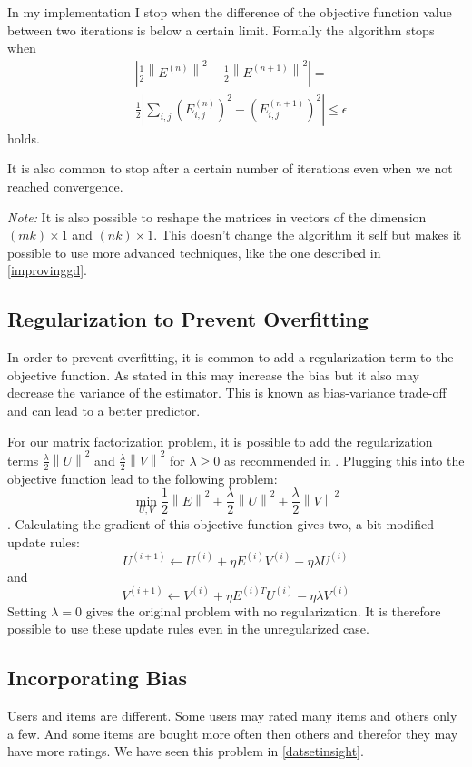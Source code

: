 \documentclass[DIV=14,twocolumn]{scrartcl}
\newcommand{\norm}[1]{\left\lVert#1\right\rVert}
\begin{document}
In my implementation I stop when the difference of the objective function value between two iterations is below a certain limit. Formally the algorithm stops when
\begin{equation*}
\begin{split}
&|\frac{1}{2}\norm{E^{(n)}}^2-\frac{1}{2}\norm{E^{(n+1)}}^2|=\\
&\frac{1}{2}|\sum_{i,j}(E_{i,j}^{(n)})^2-(E_{i,j}^{(n+1)})^2|\leq\epsilon
\end{split}
\end{equation*} $$$$ holds.

It is also common to stop after a certain number of iterations even when we not reached convergence.

\textit{Note:} It is also possible to reshape the matrices in vectors of the dimension $(mk)\times1$ and $(nk)\times1$. This doesn't change the algorithm it self but makes it possible to use more advanced techniques, like the one described in \autoref{improvinggd}.

\subsection{Regularization to Prevent Overfitting}
In order to prevent overfitting, it is common to add a regularization term to the objective function. As stated in \cite{Gi19} this may increase the bias but it also may decrease the variance of the estimator. This is known as bias-variance trade-off and can lead to a better predictor. 

For our matrix factorization problem, it is possible to add the regularization terms $\frac{\lambda}{2}\norm{U}^2$ and $\frac{\lambda}{2}\norm{V}^2$ for $\lambda \geq 0$ as recommended in \cite{Ag16}.
Plugging this into the objective function lead to the following problem: $$\min_{U,V} \frac{1}{2}\norm{E}^2 + \frac{\lambda}{2}\norm{U}^2 + \frac{\lambda}{2}\norm{V}^2$$. Calculating the gradient of this objective function gives two, a bit modified update rules: \[U^{(i+1)} \leftarrow U^{(i)} + \eta E^{(i)}V^{(i)} - \eta\lambda U^{(i)}\] and \[V^{(i+1)} \leftarrow V^{(i)} + \eta E^{(i)T}U^{(i)} - \eta\lambda V^{(i)}\]
Setting $\lambda = 0$ gives the original problem with no regularization. It is therefore possible to use these update rules even in the unregularized case.

\subsection{Incorporating Bias}
Users and items are different. Some users may rated many items and others only a few. And some items are bought more often then others and therefor they may have more ratings. We have seen this problem in \autoref{datsetinsight}.
 
\end{document}
